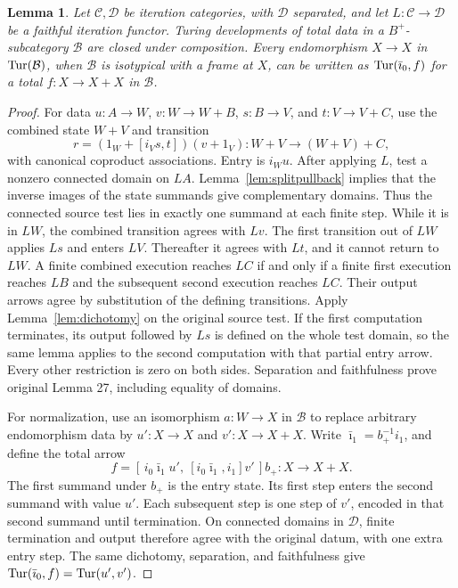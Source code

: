 \documentclass[11pt]{article}
\newtheorem{lemma}[theorem]{Lemma}
\newcommand{\C}{\mathcal C}\newcommand{\D}{\mathcal D}\newcommand{\B}{\mathcal B}
\begin{document}
\begin{lemma}\label{lem:completion}
Let $\C,\D$ be iteration categories, with $\D$ separated, and let $L:\C\to\D$ be a faithful iteration functor. Turing developments of total data in a $B^+$-subcategory $\B$ are closed under composition. Every endomorphism $X\to X$ in $\Tur(\B)$, when $\B$ is isotypical with a frame at $X$, can be written as $\operatorname{Tur}(\bar\imath_0,f)$ for a total $f:X\to X+X$ in $\B$.
\end{lemma}
\begin{proof}
For data $u:A\to W$, $v:W\to W+B$, $s:B\to V$, and $t:V\to V+C$, use the combined state $W+V$ and transition
\[
r=(1_W+[i_Vs,t])(v+1_V):W+V\to(W+V)+C,
\]
with canonical coproduct associations. Entry is $i_Wu$. After applying $L$, test a nonzero connected domain on $LA$. Lemma~\ref{lem:splitpullback} implies that the inverse images of the state summands give complementary domains. Thus the connected source test lies in exactly one summand at each finite step. While it is in $LW$, the combined transition agrees with $Lv$. The first transition out of $LW$ applies $Ls$ and enters $LV$. Thereafter it agrees with $Lt$, and it cannot return to $LW$. A finite combined execution reaches $LC$ if and only if a finite first execution reaches $LB$ and the subsequent second execution reaches $LC$. Their output arrows agree by substitution of the defining transitions. Apply Lemma~\ref{lem:dichotomy} on the original source test. If the first computation terminates, its output followed by $Ls$ is defined on the whole test domain, so the same lemma applies to the second computation with that partial entry arrow. Every other restriction is zero on both sides. Separation and faithfulness prove original Lemma 27, including equality of domains.

For normalization, use an isomorphism $a:W\to X$ in $\B$ to replace arbitrary endomorphism data by $u':X\to X$ and $v':X\to X+X$. Write $\bar\imath_1=b_+^{-1}i_1$, and define the total arrow
\[
f=[\,i_0\bar\imath_1u',\ [i_0\bar\imath_1,i_1]v'\,]b_+:X\to X+X.
\]
The first summand under $b_+$ is the entry state. Its first step enters the second summand with value $u'$. Each subsequent step is one step of $v'$, encoded in that second summand until termination. On connected domains in $\D$, finite termination and output therefore agree with the original datum, with one extra entry step. The same dichotomy, separation, and faithfulness give $\operatorname{Tur}(\bar\imath_0,f)=\operatorname{Tur}(u',v')$.
\end{proof}
\end{document}
